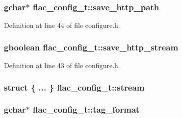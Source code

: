 \subsubsection[{\texorpdfstring{save\+\_\+http\+\_\+path}{save_http_path}}]{\setlength{\rightskip}{0pt plus 5cm}gchar$\ast$ flac\+\_\+config\+\_\+t\+::save\+\_\+http\+\_\+path}\hypertarget{structflac__config__t_af099411c154a3d80aef85c161bdada5d}{}\label{structflac__config__t_af099411c154a3d80aef85c161bdada5d}


Definition at line 44 of file configure.\+h.

\subsubsection[{\texorpdfstring{save\+\_\+http\+\_\+stream}{save_http_stream}}]{\setlength{\rightskip}{0pt plus 5cm}gboolean flac\+\_\+config\+\_\+t\+::save\+\_\+http\+\_\+stream}\hypertarget{structflac__config__t_aae530d76226e8a82fdcec21b34af0982}{}\label{structflac__config__t_aae530d76226e8a82fdcec21b34af0982}


Definition at line 43 of file configure.\+h.

\subsubsection[{\texorpdfstring{stream}{stream}}]{\setlength{\rightskip}{0pt plus 5cm}struct \{ ... \}   flac\+\_\+config\+\_\+t\+::stream}\hypertarget{structflac__config__t_a1eedd4541d45d1b527bfa92ddef6efb8}{}\label{structflac__config__t_a1eedd4541d45d1b527bfa92ddef6efb8}
\subsubsection[{\texorpdfstring{tag\+\_\+format}{tag_format}}]{\setlength{\rightskip}{0pt plus 5cm}gchar$\ast$ flac\+\_\+config\+\_\+t\+::tag\+\_\+format}\hypertarget{structflac__config__t_a313d9a19fc781cd361f06b755d6766ee}{}\label{structflac__config__t_a313d9a19fc781cd361f06b755d6766ee}


